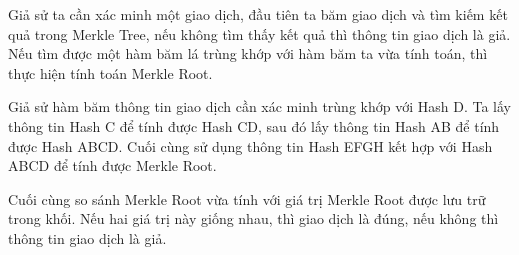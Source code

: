 Giả sử ta cần xác minh một giao dịch, đầu tiên ta băm giao dịch và tìm kiếm kết quả
trong Merkle Tree, nếu không tìm thấy kết quả thì thông tin giao dịch là giả. Nếu tìm được
một hàm băm lá trùng khớp với hàm băm ta vừa tính toán, thì thực hiện tính toán Merkle Root. 

Giả sử hàm băm thông tin giao dịch cần xác minh trùng khớp với Hash D.
Ta lấy thông tin Hash C để tính được Hash CD, sau đó lấy thông tin Hash AB để tính được Hash ABCD.
Cuối cùng sử dụng thông tin Hash EFGH kết hợp với Hash ABCD để tính được Merkle Root.

Cuối cùng so sánh Merkle Root vừa tính với giá trị Merkle Root được lưu trữ trong 
khối. Nếu hai giá trị này giống nhau, thì giao dịch là đúng, nếu không thì thông tin
giao dịch là giả.


